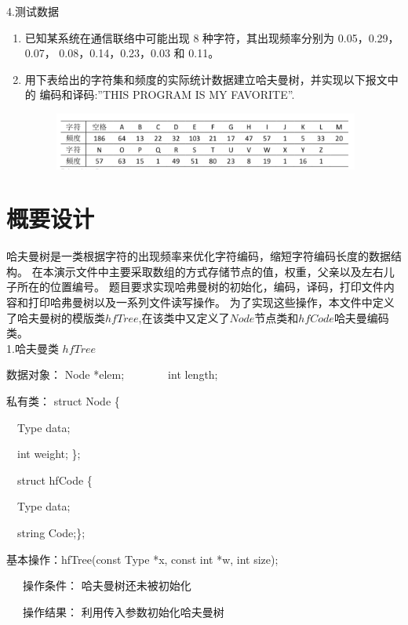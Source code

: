 \documentclass[paper=a4,UTF8,fontsize=11pt]{scrartcl} %
\numberwithin{equation}{section} %
\numberwithin{figure}{section} %
\numberwithin{table}{section} %
\begin{document}
4.测试数据
\begin{enumerate}
    \item  已知某系统在通信联络中可能出现 8 种字符，其出现频率分别为 0.05，0.29，0.07， 0.08，0.14，0.23，0.03 和 0.11。
    \item 用下表给出的字符集和频度的实际统计数据建立哈夫曼树，并实现以下报文中的 编码和译码:”THIS PROGRAM IS MY FAVORITE”.    \begin{figure}[h]
            \centering
            \includegraphics[width = 0.95\textwidth]{datasheet}
    \end{figure}

\end{enumerate}
\vspace{0.8cm}

\section{概要设计}

哈夫曼树是一类根据字符的出现频率来优化字符编码，缩短字符编码长度的数据结构。
在本演示文件中主要采取数组的方式存储节点的值，权重，父亲以及左右儿子所在的位置编号。
题目要求实现哈弗曼树的初始化，编码，译码，打印文件内容和打印哈弗曼树以及一系列文件读写操作。
为了实现这些操作，本文件中定义了哈夫曼树的模版类$hfTree$,在该类中又定义了$Node$节点类和$hfCode$哈夫曼编码类。\\

1.哈夫曼类 $hfTree$

数据对象： Node *elem;\ \ \ \ \ \ \ \ int length;

私有类：   struct Node \{

    \qquad \qquad \ \  Type data;

    \qquad \qquad \ \ int weight; \}; 

    \qquad \qquad \ \ struct hfCode \{
        
    \qquad \qquad \ \ Type data;

    \qquad \qquad \ \ string Code;\};

基本操作：hfTree(const Type *x, const int *w, int size);

\qquad \qquad \quad \ \ \ 操作条件： 哈夫曼树还未被初始化

\qquad \qquad \quad \ \ \ 操作结果： 利用传入参数初始化哈夫曼树
\end{document}
